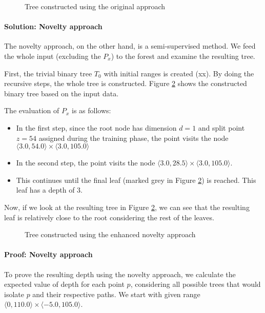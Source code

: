 \begin{figure}[htbp]
\centering

\caption{Tree constructed using the original approach}
\label{fig:example_noutlier_tree_color}
\end{figure}



\paragraph{Solution: Novelty approach}

The novelty approach, on the other hand, is a semi-supervised method. We feed the whole input (excluding the $P_x$) to the forest and examine the resulting tree.

First, the trivial binary tree $T_0$ with initial ranges is created (xx).
By doing the recursive steps, the whole tree is constructed.
Figure \ref{fig:example_novelty_tree_color} shows the constructed binary tree based on the input data.

The evaluation of $P_x$ is as follows:
\begin{itemize}
    \item In the first step, since the root node has dimension $d=1$ and split point $z = 54$ assigned during the training phase, the point visits the node $\langle 3.0, 54.0\rangle \times \langle 3.0, 105.0\rangle$
    \item In the second step, the point visits the node $\langle 3.0, 28.5\rangle \times \langle 3.0, 105.0\rangle$.
    \item This continues until the final leaf (marked grey in Figure \ref{fig:example_novelty_tree_color}) is reached. This leaf has a depth of 3.
    
\end{itemize}


Now, if we look at the resulting tree in Figure \ref{fig:example_novelty_tree_color}, we can see that the resulting leaf is relatively close to the root considering the rest of the leaves.


\begin{figure}[htbp]
\centering

\caption{Tree constructed using the enhanced novelty approach}
\label{fig:example_novelty_tree_color}
\end{figure}


\paragraph{Proof: Novelty approach}
To prove the resulting depth using the novelty approach, we calculate the expected value of depth for each point $p$, considering all possible trees that would isolate $p$ and their respective paths.
We start with given range $\langle 0, 110.0\rangle \times \langle -5.0, 105.0\rangle$.

